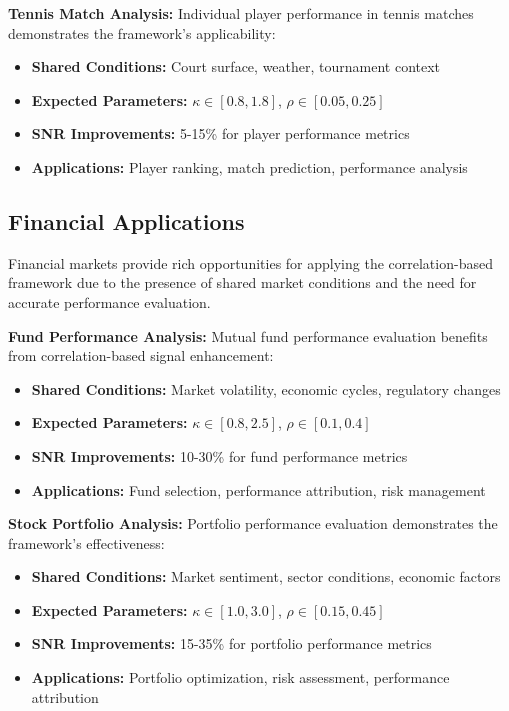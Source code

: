 \textbf{Tennis Match Analysis:}
Individual player performance in tennis matches demonstrates the framework's applicability:
\begin{itemize}
    \item \textbf{Shared Conditions:} Court surface, weather, tournament context
    \item \textbf{Expected Parameters:} $\kappa \in [0.8, 1.8]$, $\rho \in [0.05, 0.25]$
    \item \textbf{SNR Improvements:} 5-15\% for player performance metrics
    \item \textbf{Applications:} Player ranking, match prediction, performance analysis
\end{itemize}

\subsection{Financial Applications}

Financial markets provide rich opportunities for applying the correlation-based framework due to the presence of shared market conditions and the need for accurate performance evaluation.

\textbf{Fund Performance Analysis:}
Mutual fund performance evaluation benefits from correlation-based signal enhancement:
\begin{itemize}
    \item \textbf{Shared Conditions:} Market volatility, economic cycles, regulatory changes
    \item \textbf{Expected Parameters:} $\kappa \in [0.8, 2.5]$, $\rho \in [0.1, 0.4]$
    \item \textbf{SNR Improvements:} 10-30\% for fund performance metrics
    \item \textbf{Applications:} Fund selection, performance attribution, risk management
\end{itemize}

\textbf{Stock Portfolio Analysis:}
Portfolio performance evaluation demonstrates the framework's effectiveness:
\begin{itemize}
    \item \textbf{Shared Conditions:} Market sentiment, sector conditions, economic factors
    \item \textbf{Expected Parameters:} $\kappa \in [1.0, 3.0]$, $\rho \in [0.15, 0.45]$
    \item \textbf{SNR Improvements:} 15-35\% for portfolio performance metrics
    \item \textbf{Applications:} Portfolio optimization, risk assessment, performance attribution
\end{itemize}

